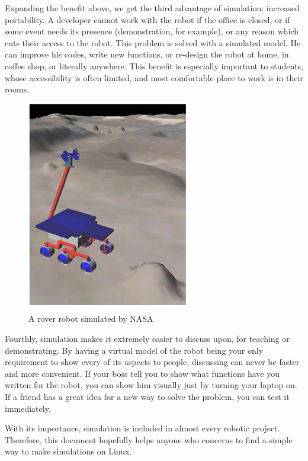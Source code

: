 \documentclass[pdftex,12pt,a4paper]{article}
\begin{document}
  \newpage
  Expanding the benefit above, we get the third advantage of simulation: increased portability. A developer cannot work with the robot if the office is closed, or if some event needs its presence (demonstration, for example), or any reason which cuts their access to the robot. This problem is solved with a simulated model. He can improve his codes, write new functions, or re-design the robot at home, in coffee shop, or literally anywhere. This benefit is especially important to students, whose accessibility is often limited, and most comfortable place to work is in their rooms. \par
  \begin{figure}[h]
    \centering
    \includegraphics[width=0.5\linewidth]{image/107988main_Sim3.jpg}
    \caption{A rover robot simulated by NASA}
    \label{fig:nasa_robot}
  \end{figure}
  Fourthly, simulation makes it extremely easier to discuss upon, for teaching or demonstrating. By having a virtual model of the robot being your only requirement to show every of its aspects to people, discussing can never be faster and more convenient. If your boss tell you to show what functions have you written for the robot, you can show him visually just by turning your laptop on. If a friend has a great idea for a new way to solve the problem, you can test it immediately.\par
  With its importance, simulation is included in almost every robotic project. Therefore, this document hopefully helps anyone who concerns to find a simple way to make simulations on Linux.
  
  \newpage
\end{document}
